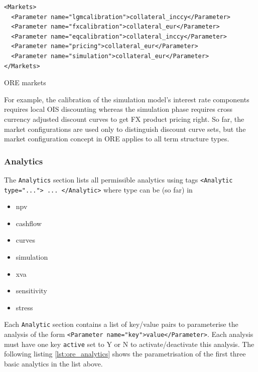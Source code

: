 \documentclass[12pt, a4paper]{article}
\begin{document}
\begin{listing}[H]
\begin{verbatim}
<Markets>
  <Parameter name="lgmcalibration">collateral_inccy</Parameter>
  <Parameter name="fxcalibration">collateral_eur</Parameter>
  <Parameter name="eqcalibration">collateral_inccy</Parameter>
  <Parameter name="pricing">collateral_eur</Parameter>
  <Parameter name="simulation">collateral_eur</Parameter>
</Markets>
\end{verbatim}
\caption{ORE markets}
\label{lst:ore_markets}
\end{listing}

For example, the calibration of the simulation model's interest rate components requires local OIS discounting whereas
the simulation phase requires cross currency adjusted discount curves to get FX product pricing right. So far, the
market configurations are used only to distinguish discount curve sets, but the market configuration concept in ORE
applies to all term structure types.

\subsubsection{Analytics}\label{sec:analytics}

The {\tt Analytics} section lists all permissible analytics using tags {\tt <Analytic type="..."> ... </Analytic>} where
type can be (so far) in
\begin{itemize}
\item npv
\item cashflow
\item curves
\item simulation
\item xva
\item sensitivity
\item stress
\end{itemize}

Each {\tt Analytic} section contains a list of key/value pairs to parameterise the analysis of the form {\tt <Parameter
  name="key">value</Parameter>}. Each analysis must have one key {\tt active} set to Y or N to activate/deactivate this
analysis.  The following listing \ref{lst:ore_analytics} shows the parametrisation of the first three basic analytics in
the list above.
\end{document}
